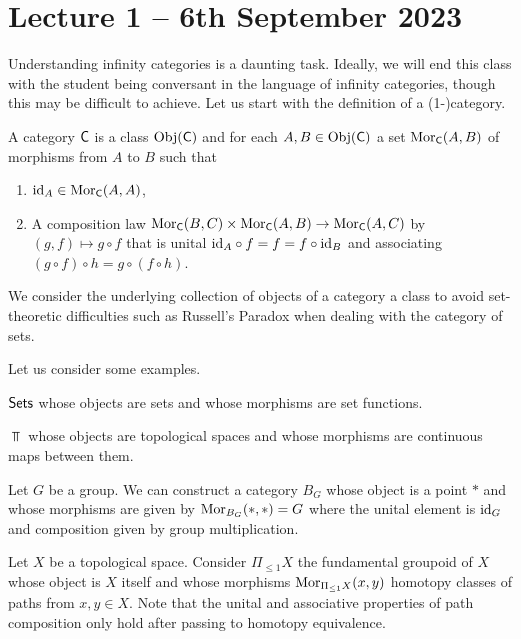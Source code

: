 \section{Lecture 1 -- 6th September 2023}
Understanding infinity categories is a daunting task. Ideally, we will end this class with the student being conversant in the language of infinity categories, though this may be difficult to achieve. Let us start with the definition of a (1-)category. 
\begin{definition}[Category]
    A category $\mathsf{C}$ is a class $\mathrm{Obj}(\mathsf{C})$ and for each $A,B\in\mathrm{Obj}(\mathsf{C})$ a set $\mathrm{Mor}_{\mathsf{C}}(A,B)$ of morphisms from $A$ to $B$ such that
    \begin{enumerate}[label=(\alph*)]
        \item $\mathrm{id}_{A}\in\mathrm{Mor}_{\mathsf{C}}(A,A)$,
        \item A composition law $\mathrm{Mor}_{\mathsf{C}}(B,C)\times\mathrm{Mor}_{\mathsf{C}}(A,B)\to\mathrm{Mor}_{\mathsf{C}}(A,C)$ by $(g,f)\mapsto g\circ f$ that is unital $\mathrm{id}_{A}\circ f=f=f\circ\mathrm{id}_{B}$ and associating $(g\circ f)\circ h=g\circ(f\circ h)$. 
    \end{enumerate}
\end{definition}
\begin{remark}
  We consider the underlying collection of objects of a category a class to avoid set-theoretic difficulties such as Russell's Paradox when dealing with the category of sets. 
\end{remark}
Let us consider some examples. 
\begin{example}
  $\mathsf{Sets}$ whose objects are sets and whose morphisms are set functions. 
\end{example}
\begin{example}
  $\Top$ whose objects are topological spaces and whose morphisms are continuous maps between them. 
\end{example}
\begin{example}\label{ex:representable spaces}
Let $G$ be a group. We can construct a category $B_{G}$ whose object is a point $*$ and whose morphisms are given by $\mathrm{Mor}_{B_{G}}(*,*)=G$ where the unital element is $\mathrm{id}_{G}$ and composition given by group multiplication.
\end{example}
\begin{example}
Let $X$ be a topological space. Consider $\Pi_{\leq1}X$ the fundamental groupoid of $X$ whose object is $X$ itself and whose morphisms $\mathrm{Mor}_{\Pi_{\leq1}X}(x,y)$ homotopy classes of paths from $x,y\in X$. Note that the unital and associative properties of path composition only hold after passing to homotopy equivalence. 
\end{example}
